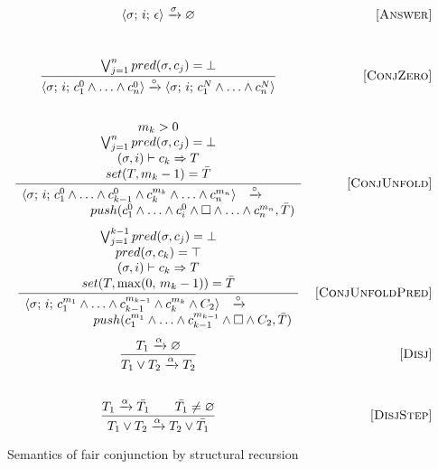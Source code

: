 \begin{figure*} %
\[\begin{array}{cr}
      {\inbr{\sigma;\, i;\, \epsilon} \xrightarrow{\sigma} \emptyset}  
&     \ruleno{Answer} \\[10mm]
\dfrac{\bigvee_{j=1}^n pred(\sigma, c_j) = \bot}
      {\inbr{\sigma;\, i;\, c_1^0 \land \ldots \land c_n^0} \xrightarrow{\circ} \inbr{\sigma;\, i;\, c_1^N \land \ldots \land c_n^N}}
      &  \ruleno{ConjZero} \\[10mm]
      \dfrac{\begin{array}{c}
          m_k > 0 \\
          \bigvee_{j=1}^n pred(\sigma, c_j) = \bot \\
          (\sigma, i) \vdash c_k \Rightarrow T \\
          set(T, m_k - 1) = \bar{T}
          \end{array}
      }
            {
              \begin{array}{rcl}
                \inbr{\sigma;\, i;\, c_1^0 \land \ldots \land c_{k-1}^0 \land c_k^{m_k} \land \ldots \land c_n^{m_n}} & \xrightarrow{\circ} & \\
                \multicolumn{3}{c}{\phantom{XXXXXX}push(c_1^0 \land \ldots \land c_i^0 \land \Box \land \ldots \land c_n^{m_n}, \bar{T})}
              \end{array}
              }
      &     \ruleno{ConjUnfold} \\[10mm]
      
      \dfrac{
        \begin{array}{c}
          \bigvee_{j=1}^{k-1} pred(\sigma, c_j) = \bot \\
          pred(\sigma, c_k) = \top \\
          (\sigma, i) \vdash c_k \Rightarrow T \\
          set(T, \max(0, \, m_k - 1)) = \bar{T}
        \end{array}
      }
            {
              \begin{array}{rcl}
                \inbr{\sigma;\, i;\, c_1^{m_1} \land \ldots \land c_{k-1}^{m_{k-1}} \land c_k^{m_k} \land C_2} &\xrightarrow{\circ} & \\
                \multicolumn{3}{c}{\phantom{XXXXXX}push(c_1^{m_1} \land \ldots \land c_{k-1}^{m_{k-1}} \land \Box \land C_2, \bar{T})}
              \end{array}
            }
&     \ruleno{ConjUnfoldPred} \\[10mm]
\dfrac{T_1 \xrightarrow{\alpha} \emptyset}
      {T_1 \lor T_2 \xrightarrow{\alpha} T_2}
&     \ruleno{Disj} \\[10mm]
\dfrac{T_1 \xrightarrow{\alpha} \bar{T_1} \qquad \bar{T_1} \not= \emptyset}
      {T_1 \lor T_2 \xrightarrow{\alpha} T_2 \lor\bar{T_1}}
&     \ruleno{DisjStep}
\end{array}\]
\caption{Semantics of fair conjunction by structural recursion}
\label{fair:structural-recursion-semantics}
\end{figure*}

